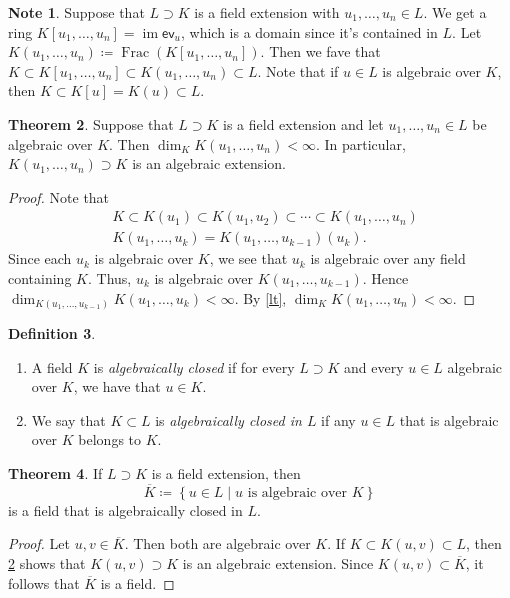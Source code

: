 \documentclass[10pt,letterpaper,cm]{nupset}
\theoremstyle{definition}
\newtheorem{definition}{Definition}[subsection]
\newtheorem{note}[definition]{Note}
\theoremstyle{theorem}
\newtheorem{theorem}[definition]{Theorem}
\theoremstyle{remark}
\newcommand{\1}{\mathbf{1}}
\newcommand{\0}{\vec 0}
\DeclareMathOperator{\im}{im}
\DeclareMathOperator{\Frac}{Frac}
\begin{document}
\begin{note}
Suppose  that $L \supset K$ is a field extension with $u_1, \ldots, u_n \in L$. We get a ring $K[u_1, \ldots, u_n]= \im{\mathsf{ev}_u}$, which is a domain since it's contained in $L$. Let $K(u_1, \ldots, u_n) \coloneqq  \Frac(K[u_1, \ldots, u_n])$. Then we fave that $K \subset K[u_1, \ldots, u_n] \subset K(u_1, \ldots, u_n) \subset L$. Note that if $u\in L$ is algebraic over $K$, then $K \subset K[u] = K(u) \subset L$. 
\end{note}

\begin{theorem}\label{ext}
Suppose that $L \supset K$ is a field extension and let $u_1, \ldots, u_n \in L$ be algebraic over $K$. Then $\dim_K{K(u_1, \ldots, u_n)} < \infty$. In particular, $K(u_1, \ldots, u_n) \supset K$ is an algebraic extension. 
\end{theorem}
\begin{proof}
Note that 
\begin{align*}
& K   \subset K(u_1) \subset K(u_1, u_2) \subset \cdots \subset K(u_1, \ldots, u_n)
\\ & K(u_1, \ldots, u_k) = K(u_1, \ldots, u_{k-1})(u_k).
\end{align*}  Since each $u_k$ is algebraic over $K$, we see that $u_k$ is algebraic over any field containing $K$. Thus, $u_k$ is algebraic over $K(u_1, \ldots, u_{k-1})$. Hence $\dim_{K(u_1, \ldots, u_{k-1})}{K(u_1, \ldots, u_k)} < \infty$. By \cref{lt}, $\dim_K{K(u_1, \ldots, u_n)} <\infty$.
\end{proof}

\begin{definition} $ $
\begin{enumerate}
\item A field $K$ is \textit{algebraically closed} if for every $L \supset K$ and every  $u\in L$ algebraic  over $K$, we have that $u\in K$. 
\item We say that $K\subset L$ is \textit{algebraically closed in $L$} if any $u\in L$ that is algebraic over $K$ belongs to $K$. 
\end{enumerate}
\end{definition}

\begin{theorem}
If $L \supset K$ is a field extension, then $$\overline{K}\coloneqq  \left\{u\in L \mid u \text{ is algebraic over }K\right\}$$ is a field that is algebraically closed in $L$.
\end{theorem}
\begin{proof}
Let $u,v \in \overline{K}$. Then both are algebraic over $K$. If $K \subset K(u,v) \subset L$, then \cref{ext} shows that $K(u,v) \supset K$ is an algebraic extension. Since $K(u,v) \subset \overline{K}$, it follows that $\overline{K}$ is a field. 
\end{proof}
\end{document}
